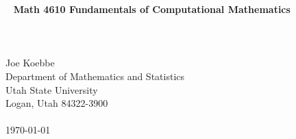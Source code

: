 \documentclass[10pt,fleqn]{article}
\begin{document}
\begin{center}
  \
  \vskip1.5in
  {\Large{\bf
    Math 4610 Fundamentals of Computational Mathematics \\
  \ \\
  \ \\
  \ \\
  }}
  \vskip1.5in
  Joe Koebbe \\
  Department of Mathematics and Statistics \\
  Utah State University \\
  Logan, Utah 84322-3900 \\
   \ \\
  \today
\end{center}
\end{document}
